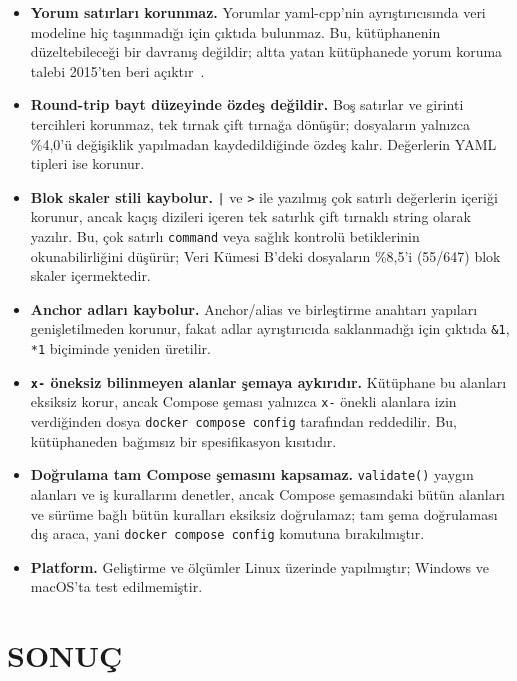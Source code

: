 \documentclass[12pt,a4paper]{article}
\begin{document}
\begin{itemize}
  \item \textbf{Yorum satırları korunmaz.} Yorumlar yaml-cpp'nin
    ayrıştırıcısında veri modeline hiç taşınmadığı için çıktıda bulunmaz.
    Bu, kütüphanenin düzeltebileceği bir davranış değildir; altta yatan
    kütüphanede yorum koruma talebi 2015'ten beri açıktır~\cite{yamlcpp_issue154}.
  \item \textbf{Round-trip bayt düzeyinde özdeş değildir.} Boş satırlar ve
    girinti tercihleri korunmaz, tek tırnak çift tırnağa dönüşür;
    dosyaların yalnızca \%4,0'ü değişiklik yapılmadan kaydedildiğinde
    özdeş kalır. Değerlerin YAML tipleri ise korunur.
  \item \textbf{Blok skaler stili kaybolur.} \texttt{|} ve \texttt{>}
    ile yazılmış çok satırlı değerlerin içeriği korunur, ancak kaçış
    dizileri içeren tek satırlık çift tırnaklı string olarak yazılır. Bu,
    çok satırlı \texttt{command} veya sağlık kontrolü betiklerinin
    okunabilirliğini düşürür; Veri Kümesi B'deki dosyaların \%8,5'i (55/647)
    blok skaler içermektedir.
  \item \textbf{Anchor adları kaybolur.} Anchor/alias ve birleştirme
    anahtarı yapıları genişletilmeden korunur, fakat adlar ayrıştırıcıda
    saklanmadığı için çıktıda \texttt{\&1}, \texttt{*1} biçiminde yeniden
    üretilir.
  \item \textbf{\texttt{x-} öneksiz bilinmeyen alanlar şemaya aykırıdır.}
    Kütüphane bu alanları eksiksiz korur, ancak Compose şeması yalnızca
    \texttt{x-} önekli alanlara izin verdiğinden dosya
    \texttt{docker compose config} tarafından reddedilir. Bu, kütüphaneden
    bağımsız bir spesifikasyon kısıtıdır.
  \item \textbf{Doğrulama tam Compose şemasını kapsamaz.}
    \texttt{validate()} yaygın alanları ve iş kurallarını denetler, ancak
    Compose şemasındaki bütün alanları ve sürüme bağlı bütün kuralları
    eksiksiz doğrulamaz; tam şema doğrulaması dış araca, yani
    \texttt{docker compose config} komutuna bırakılmıştır.
  \item \textbf{Platform.} Geliştirme ve ölçümler Linux üzerinde
    yapılmıştır; Windows ve macOS'ta test edilmemiştir.
\end{itemize}

\section{SONUÇ}
\label{sec:sonuc}
\end{document}
